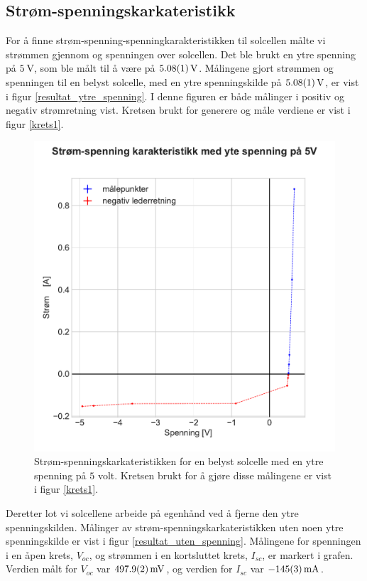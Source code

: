 \documentclass[%
 reprint,
 amsmath,amssymb,
 aps,
 norsk,
 booktabs
]{revtex4-1}
\begin{document}
\subsection{Strøm-spenningskarkateristikk}
For å finne strøm-spenning-spenningkarakteristikken til solcellen målte vi strømmen gjennom og spenningen over solcellen. Det ble brukt en ytre spenning på $\SI{5}{\volt}$, som ble målt til å være på $\SI{5.08\pm0.01}{\volt}$. Målingene gjort strømmen og spenningen til en belyst solcelle, med en ytre spenningskilde på $\SI{5.08\pm0.01}{\volt}$, er vist i figur \vref{resultat_ytre_spenning}. I denne figuren er både målinger i positiv og negativ strømretning vist. Kretsen brukt for generere og måle verdiene er vist i figur \vref{krets1}.\\
\begin{figure}
  \centering
  \includegraphics[scale=0.47]{ytre_spenning.pdf}
  \caption{Strøm-spenningskarkateristikken for en belyst solcelle med en ytre spenning på $5$ volt. Kretsen brukt for å gjøre disse målingene er vist i figur \vref{krets1}.}
  \label{resultat_ytre_spenning}
\end{figure}
Deretter lot vi solcellene arbeide på egenhånd ved å fjerne den ytre spenningskilden. Målinger av strøm-spenningskarkateristikken uten noen ytre spenningskilde er vist i figur \vref{resultat_uten_spenning}. Målingene for spenningen i en åpen krets, $V_{oc}$, og strømmen i en kortsluttet krets, $I_{sc}$, er markert i grafen. Verdien målt for $V_{oc}$ var $\SI{497.9\pm0.2}{\milli\volt}$, og verdien for $I_{sc}$ var $\SI{-145\pm3}{\milli\ampere}$.\\
\end{document}
